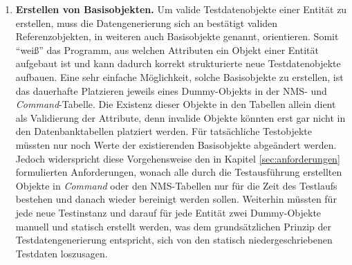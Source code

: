 \begin{enumerate}
    \item \textbf{Erstellen von Basisobjekten.} Um valide Testdatenobjekte einer Entität zu erstellen, muss die Datengenerierung sich an bestätigt validen Referenzobjekten, in weiteren auch Basisobjekte genannt, orientieren. Somit \enquote{weiß} das Programm, aus welchen Attributen ein Objekt einer Entität aufgebaut ist und kann dadurch korrekt strukturierte neue Testdatenobjekte aufbauen. Eine sehr einfache Möglichkeit, solche Basisobjekte zu erstellen, ist das dauerhafte Platzieren jeweils eines Dummy-Objekts in der \ac{NMS}- und \textit{Command}-Tabelle. Die Existenz dieser Objekte in den Tabellen allein dient als Validierung der Attribute, denn invalide Objekte könnten erst gar nicht in den Datenbanktabellen platziert werden. Für tatsächliche Testobjekte müssten nur noch Werte der existierenden Basisobjekte abgeändert werden. Jedoch widerspricht diese Vorgehensweise den in Kapitel \ref{sec:anforderungen} formulierten Anforderungen, wonach alle durch die Testausführung erstellten Objekte in \textit{Command} oder den \ac{NMS}-Tabellen nur für die Zeit des Testlaufs bestehen und danach wieder bereinigt werden sollen. Weiterhin müssten für jede neue Testinstanz und darauf für jede Entität zwei Dummy-Objekte manuell und statisch erstellt werden, was dem grundsätzlichen Prinzip der Testdatengenerierung entspricht, sich von den statisch niedergeschriebenen Testdaten loszusagen.
    

\end{enumerate}
